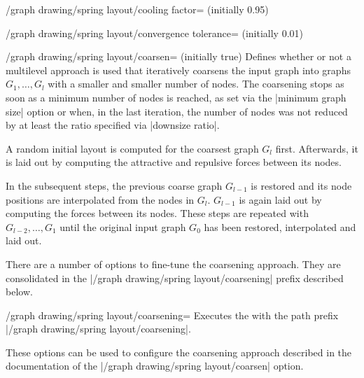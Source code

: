 \begin{key}{/graph drawing/spring layout/cooling factor=
  (initially 0.95)}
\end{key}

\begin{key}{/graph drawing/spring layout/convergence
  tolerance= (initially 0.01)}
\end{key}

\begin{key}{/graph drawing/spring layout/coarsen=
  (initially true)}
  Defines whether or not a multilevel approach is used that
  iteratively coarsens the input graph into graphs $G_1,\dots,G_l$ with 
  a smaller and smaller number of nodes. The coarsening stops as soon as
  a minimum number of nodes is reached, as set via the 
  |minimum graph size| option or when, in the last iteration, the 
  number of nodes was not reduced by at least the ratio specified via 
  |downsize ratio|. 

  A random initial layout is computed for the coarsest graph $G_l$ first.
  Afterwards, it is laid out by computing the attractive and repulsive
  forces between its nodes. 
  
  In the subsequent steps, the previous coarse graph $G_{l-1}$ is 
  restored and its node positions are interpolated from the nodes in 
  $G_l$. $G_{l-1}$ is again laid out by computing the forces between 
  its nodes. These steps are repeated with $G_{l-2},\dots,G_1$ until 
  the original input graph $G_0$ has been restored, interpolated 
  and laid out.

  There are a number of options to fine-tune the coarsening approach.
  They are consolidated in the |/graph drawing/spring layout/coarsening|
  prefix described below.
\end{key}

\begin{key}{/graph drawing/spring layout/coarsening=}
  Executes the  with the path prefix 
  |/graph drawing/spring layout/coarsening|.

  These options can be used to configure the coarsening approach
  described in the documentation of the 
  |/graph drawing/spring layout/coarsen| option.
\end{key}

